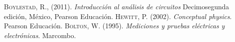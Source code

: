 \begin{thebibliography}{X}
	 \textsc{Boylestad, R.}, (2011). \textit{Introducción al análisis de circuitos} Decimosegunda edición, México, Pearson Educación.
	 \textsc{Hewitt, P.} (2002). \textit{Conceptual physics}. Pearson Educación.
	 \textsc{Bolton, W.} (1995). \textit{Mediciones y pruebas eléctricas y electrónicas}. Marcombo.
\end{thebibliography}